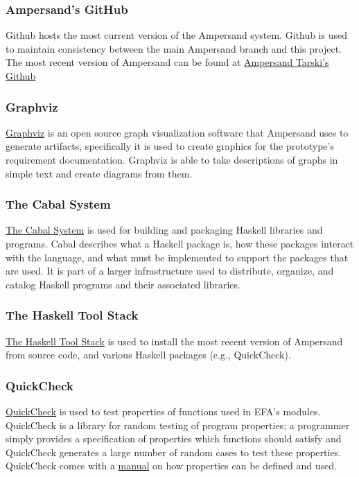 \documentclass[journal,12pt,onecolumn,draftclsnofoot]{article}
\let\Oldsubsubsection\subsubsection
\renewcommand{\subsubsection}{\FloatBarrier\Oldsubsubsection}
\begin{document}
\subsubsection*{Ampersand's GitHub}\label{Github}
\noindent
Github hosts the most current version of the Ampersand system. Github is used 
to maintain consistency between the main Ampersand branch and this project. The 
most recent version of Ampersand can be found at 
\href{https://github.com/AmpersandTarski}{Ampersand Tarski's Github }


\subsubsection*{Graphviz}
\noindent
\href{http://www.softpedia.com/get/Others/Miscellaneous/Graphviz.shtml}{Graphviz}
 is an open source graph visualization software that Ampersand uses to generate 
 artifacts, specifically it is used to create graphics for the prototype's 
 requirement documentation. Graphviz is able to take descriptions of graphs in 
 simple text and create diagrams from them. 

\subsubsection*{The Cabal System}
\noindent
\href{https://www.haskell.org/cabal/}{The Cabal System} is used for building 
and packaging Haskell libraries and programs. 
Cabal describes what a Haskell package is, how these packages interact with the 
language, and what must be implemented to support the packages that are used. 
It is part of a larger infrastructure used to distribute, organize, and catalog 
Haskell programs and their associated libraries. \cite{hackage}

\subsubsection*{The Haskell Tool Stack}
\noindent
\href{https://www.haskell.org/cabal/}{The Haskell Tool Stack} is used to 
install the most recent version of Ampersand from source code, and various 
Haskell packages (e.g., QuickCheck).

\subsubsection*{QuickCheck}
\noindent
\href{https://hackage.haskell.org/package/QuickCheck}{QuickCheck} is used to 
test properties of functions used in EFA's modules. QuickCheck is a library for 
random testing of program properties; a programmer simply provides a 
specification of properties which functions should satisfy and QuickCheck 
generates a large number of random cases to test these properties. QuickCheck 
comes with a
\href{http://www.cse.chalmers.se/~rjmh/QuickCheck/manual.html}{manual} on how 
properties can be defined and used. 
\end{document}
